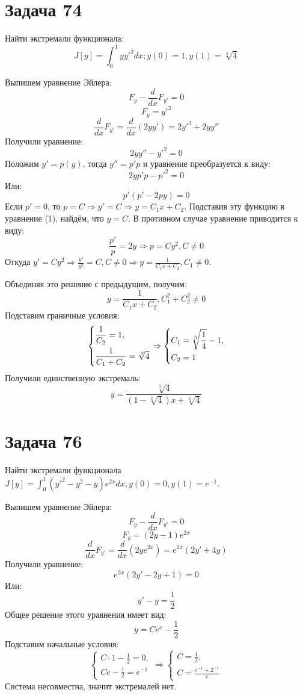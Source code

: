 \documentclass[11pt]{article}
\begin{document}
\section{Задача 74}
\label{sec:org962e2b2}
Найти экстремали функционала:
$$J[y] = \int_0^1yy'^2dx; y(0) = 1, y(1) = \sqrt[3]4$$

Выпишем уравнение Эйлера:
$$F_y - \frac{d}{dx}F_{y'} = 0$$
$$F_y = y'^2$$
$$\frac{d}{dx}F_{y'} = \frac{d}{dx}(2yy') = 2y'^2 + 2yy''$$
Получили уравнение:
\begin{equation}
2yy'' - y'^2 = 0
\end{equation}
Положим \(y' = p(y)\), тогда \(y'' = p'p\) и уравнение преобразуется к виду:
$$2yp'p - p'^2 = 0$$
Или:
$$p'(p' - 2py) = 0$$
Если \(p' = 0\), то \(p = C \Rightarrow y' = C \Rightarrow y = C_1x + C_2\). Подставив эту функцию в уравнение (1), найдём,
что \(y = C\).
В противном случае уравнение приводится к виду:
$$\frac{p'}p = 2y \Rightarrow p = Cy^2, C \neq 0$$
Откуда \(y' = Cy^2 \Rightarrow \frac{y'}{y^2} = C, C \neq 0 \Rightarrow y = \frac{1}{C_1x + C_2}, C_1 \neq 0\).

Объединяя это решение с предыдущим, получим:
$$y = \frac{1}{C_1x + C_2}, C_1^2 + C_2^2 \neq 0$$
Подставим граничные условия:
\begin{equation*}
\begin{dcases}
\frac{1}{C_2} = 1, \\
\frac{1}{C_1 + C_2} = \sqrt[3]4
\end{dcases}
\Rightarrow
\begin{dcases}
C_1 = \sqrt[3]{\frac{1}4} - 1, \\
C_2 = 1
\end{dcases}
\end{equation*}
Получили единственную экстремаль:
$$y = \frac{\sqrt[3]4}{(1 - \sqrt[3]4)x + \sqrt[3]4}$$
\section{Задача 76}
\label{sec:org06ab0ce}
Найти экстремали функционала \(J[y] = \int_0^1(y'^2 - y^2 - y)e^{2x}dx, y(0) = 0, y(1) = e^{-1}\).

Выпишем уравнение Эйлера:
$$F_y - \frac{d}{dx}F_{y'} = 0$$
$$F_y = (2y - 1)e^{2x}$$
$$\frac{d}{dx}F_{y'}= \frac{d}{dx}(2ye^{2x}) = e^{2x}(2y' + 4y)$$
Получили уравнение:
$$e^{2x}(2y' - 2y + 1) = 0$$
Или:
$$y' - y = \frac{1}2$$
Общее решение этого уравнения имеет вид:
$$y = Ce^x - \frac{1}2$$
Подставим начальные условия:
\begin{equation*}
\begin{cases}
C\cdot1 - \frac{1}2 = 0, \\
Ce - \frac{1}2 = e^{-1}
\end{cases}
\Rightarrow
\begin{cases}
C = \frac{1}2, \\
C = \frac{e^{-1} + 2^{-1}}e
\end{cases}
\end{equation*}
Система несовместна, значит экстремалей нет.
\end{document}
